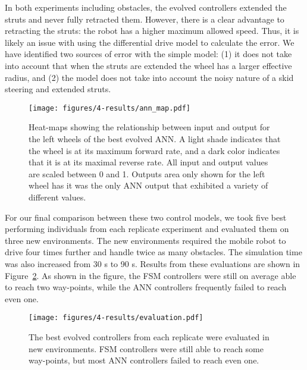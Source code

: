 In both experiments including obstacles, the evolved controllers extended the struts and never fully retracted them.
%
However, there is a clear advantage to retracting the struts: the robot has a higher maximum allowed speed.
%
Thus, it is likely an issue with using the differential drive model to calculate the error.
%
We have identified two sources of error with the simple model: (1) it does not take into account that when the struts are extended the wheel has a larger effective radius, and (2) the model does not take into account the noisy nature of a skid steering and extended struts.


\begin{figure}[!ht]
    \centering


    \texttt{[image: figures/4-results/ann\_map.pdf]}


    \caption{Heat-maps showing the relationship between input and output for the left wheels of the best evolved ANN. A light shade indicates that the wheel is at its maximum forward rate, and a dark color indicates that it is at its maximal reverse rate. All input and output values are scaled between 0 and 1. Outputs area only shown for the left wheel has it was the only ANN output that exhibited a variety of different values.}
    \label{fig:ANN-40-2-best-ann-map}


\end{figure}


For our final comparison between these two control models, we took five best performing individuals from each replicate experiment and evaluated them on three new environments. The new environments required the mobile robot to drive four times further and handle twice as many obstacles. The simulation time was also increased from 30 s to 90 s.
%
Results from these evaluations are shown in Figure~\ref{fig:evaluation}.
%
As shown in the figure, the FSM controllers were still on average able to reach two way-points, while the ANN controllers frequently failed to reach even one.


\begin{figure}[!ht]
    \centering

    \texttt{[image: figures/4-results/evaluation.pdf]}

    \caption{The best evolved controllers from each replicate were evaluated in new environments. FSM controllers were still able to reach some way-points, but most ANN controllers failed to reach even one.}
    \label{fig:evaluation}

\end{figure}




